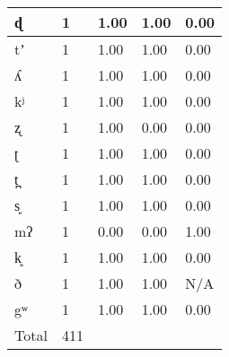 \begin{longtable}{|l|l|l|l|l|}
ɖ       & 1     & 1.00    & 1.00   & 0.00  \\ \hline
tʼ      & 1     & 1.00    & 1.00   & 0.00  \\ \hline
ʎ       & 1     & 1.00    & 1.00   & 0.00  \\ \hline
kʲ      & 1     & 1.00    & 1.00   & 0.00  \\ \hline
ʐ       & 1     & 1.00    & 0.00   & 0.00  \\ \hline
ʈ       & 1     & 1.00    & 1.00   & 0.00  \\ \hline
t̪      & 1     & 1.00    & 1.00   & 0.00  \\ \hline
s͈      & 1     & 1.00    & 1.00   & 0.00  \\ \hline
mʔ      & 1     & 0.00    & 0.00   & 1.00  \\ \hline
k͈      & 1     & 1.00    & 1.00   & 0.00  \\ \hline
ð       & 1     & 1.00    & 1.00   & N/A   \\ \hline
gʷ      & 1     & 1.00    & 1.00   & 0.00  \\ \hline
Total   & 411   &         &        &       \\ \hline
\end{longtable}